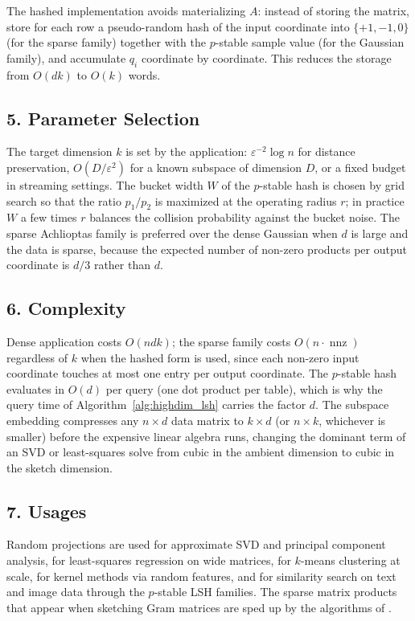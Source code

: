 The hashed implementation avoids materializing $A$: instead of storing the
matrix, store for each row a pseudo-random hash of the input coordinate into
$\{+1, -1, 0\}$ (for the sparse family) together with the $p$-stable sample
value (for the Gaussian family), and accumulate $q_i$ coordinate by coordinate.
This reduces the storage from $O(dk)$ to $O(k)$ words.

\subsection{5. Parameter Selection}

The target dimension $k$ is set by the application: $\varepsilon^{-2}\log n$
for distance preservation, $O(D/\varepsilon^2)$ for a known subspace of
dimension $D$, or a fixed budget in streaming settings. The bucket width $W$
of the $p$-stable hash is chosen by grid search so that the ratio
$p_1/p_2$ is maximized at the operating radius $r$; in practice $W$ a few
times $r$ balances the collision probability against the bucket noise. The
sparse Achlioptas family is preferred over the dense Gaussian when
$d$ is large and the data is sparse, because the expected number of non-zero
products per output coordinate is $d/3$ rather than $d$.

\subsection{6. Complexity}

Dense application costs $O(n d k)$; the sparse family costs
$O(n \cdot \operatorname{nnz})$ regardless of $k$ when the hashed form is
used, since each non-zero input coordinate touches at most one entry per
output coordinate. The $p$-stable hash evaluates in $O(d)$ per query (one dot
product per table), which is why the query time of
Algorithm~\ref{alg:highdim_lsh} carries the factor $d$. The subspace embedding
compresses any $n \times d$ data matrix to $k \times d$ (or $n \times k$,
whichever is smaller) before the expensive linear algebra runs, changing the
dominant term of an SVD or least-squares solve from cubic in the ambient
dimension to cubic in the sketch dimension.

\subsection{7. Usages}

Random projections are used for approximate SVD and principal component
analysis, for least-squares regression on wide matrices, for $k$-means
clustering at scale, for kernel methods via random features, and for
similarity search on text and image data through the $p$-stable LSH families.
The sparse matrix products that appear when sketching Gram matrices are
sped up by the algorithms of \cite{yuster2004}.

